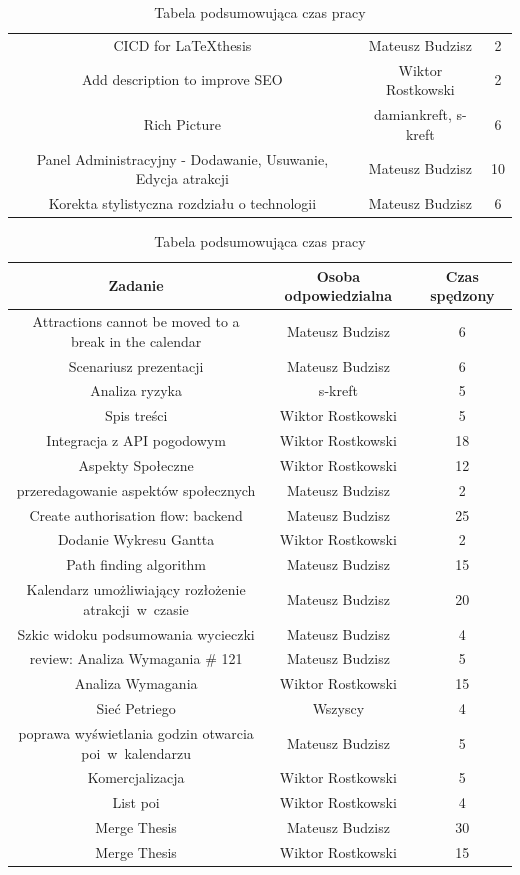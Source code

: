 \begin{table}[h!]
\begin{tabular}{|c|c|c|}
CICD for \LaTeX thesis	&	Mateusz Budzisz	&	2	\\
Add description to improve SEO	&	Wiktor Rostkowski	&	2	\\
Rich Picture	&	damiankreft, s-kreft	&	6	\\
Panel Administracyjny - Dodawanie, Usuwanie, Edycja atrakcji	&	Mateusz Budzisz	&	10	\\
Korekta stylistyczna rozdziału o technologii	&	Mateusz Budzisz	&	6	\\
\hline
\end{tabular}
\caption{Tabela podsumowująca czas pracy}
\label{tab:podsumowanie prac}
\end{table}

\begin{table}[h!]
    \centering
    \begin{tabular}{|c|c|c|}
        \hline					
        Zadanie	&	Osoba odpowiedzialna	& Czas spędzony\\
        \hline		
Attractions cannot be moved to a  break in the calendar	&	Mateusz Budzisz	&	6	\\
Scenariusz prezentacji	&	Mateusz Budzisz	&	6	\\
Analiza ryzyka	&	s-kreft	&	5	\\
Spis treści	&	Wiktor Rostkowski	&	5	\\
Integracja z API pogodowym 	&	Wiktor Rostkowski	&	18	\\
Aspekty Społeczne	&	Wiktor Rostkowski	&	12	\\
przeredagowanie aspektów społecznych	&	Mateusz Budzisz	&	2	\\
Create authorisation flow: backend 	&	Mateusz Budzisz	&	25	\\
Dodanie Wykresu Gantta	&	Wiktor Rostkowski	&	2	\\
Path finding algorithm	&	Mateusz Budzisz	&	15	\\
Kalendarz umożliwiający rozłożenie atrakcji~w~czasie	&	Mateusz Budzisz	&	20	\\
Szkic widoku podsumowania wycieczki	&	Mateusz Budzisz	&	4	\\
review: Analiza Wymagania \# 121	&	Mateusz Budzisz	&	5	\\
Analiza Wymagania	&	Wiktor Rostkowski	&	15	\\
Sieć Petriego	&	Wszyscy	&	4	\\
poprawa wyświetlania godzin otwarcia poi~w~kalendarzu	&	Mateusz Budzisz	&	5	\\
Komercjalizacja	&	Wiktor Rostkowski	&	5	\\
List poi	&	Wiktor Rostkowski	&	4	\\
Merge Thesis	&	Mateusz Budzisz	&	30	\\
Merge Thesis	&	Wiktor Rostkowski	&	15	\\
\hline
\end{tabular}
\caption{Tabela podsumowująca czas pracy}
\label{tab:podsumowanie prac}
\end{table}